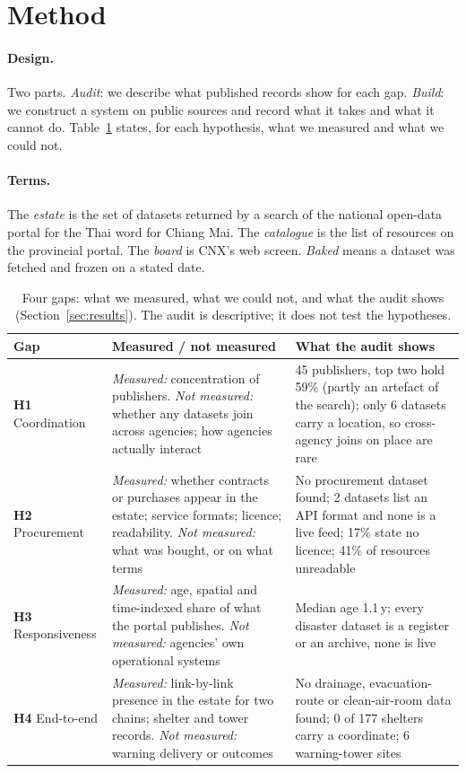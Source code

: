\documentclass[10pt,twocolumn,a4paper]{article}
\newcommand{\hyp}[1]{\textbf{\color{sigred}#1}}
\begin{document}
\section{Method}
\paragraph{Design.} Two parts. \emph{Audit}: we describe what published records show for each gap. \emph{Build}: we construct a system on public sources and record what it takes and what it cannot do. Table~\ref{tab:hyp} states, for each hypothesis, what we measured and what we could not.
\paragraph{Terms.} The \emph{estate} is the set of datasets returned by a search of the national open-data portal for the Thai word for Chiang Mai. The \emph{catalogue} is the list of resources on the provincial portal. The \emph{board} is CNX's web screen. \emph{Baked} means a dataset was fetched and frozen on a stated date.

\begin{table}[!t]
\centering\small
\caption{Four gaps: what we measured, what we could not, and what the audit shows (Section~\ref{sec:results}). The audit is descriptive; it does not test the hypotheses.}\label{tab:hyp}
\begin{tabularx}{\textwidth}{@{}p{2.2cm}XX@{}}
\toprule
\textbf{Gap} & \textbf{Measured / not measured} & \textbf{What the audit shows}\\\midrule
\hyp{H1} Coordination & \emph{Measured:} concentration of publishers. \emph{Not measured:} whether any datasets join across agencies; how agencies actually interact & 45 publishers, top two hold 59\% (partly an artefact of the search); only 6 datasets carry a location, so cross-agency joins on place are rare\\
\hyp{H2} Procurement & \emph{Measured:} whether contracts or purchases appear in the estate; service formats; licence; readability. \emph{Not measured:} what was bought, or on what terms & No procurement dataset found; 2 datasets list an API format and none is a live feed; 17\% state no licence; 41\% of resources unreadable\\
\hyp{H3} Responsiveness & \emph{Measured:} age, spatial and time-indexed share of what the portal publishes. \emph{Not measured:} agencies' own operational systems & Median age 1.1\,y; every disaster dataset is a register or an archive, none is live\\
\hyp{H4} End-to-end & \emph{Measured:} link-by-link presence in the estate for two chains; shelter and tower records. \emph{Not measured:} warning delivery or outcomes & No drainage, evacuation-route or clean-air-room data found; 0 of 177 shelters carry a coordinate; 6 warning-tower sites\\\bottomrule
\end{tabularx}
\end{table}
\end{document}
